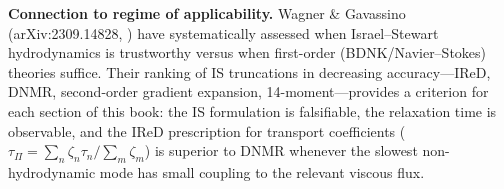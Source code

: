 \medskip\noindent\textbf{Connection to regime of applicability.}
Wagner \& Gavassino (arXiv:2309.14828, \citealt{WagnerGavassinoRegime2024})
have systematically assessed when Israel--Stewart hydrodynamics is
trustworthy versus when first-order (BDNK/Navier--Stokes) theories
suffice.  Their ranking of IS truncations in decreasing accuracy---IReD,
DNMR, second-order gradient expansion, 14-moment---provides a criterion
for each section of this book: the IS formulation is falsifiable, the
relaxation time is observable, and the IReD prescription for transport
coefficients ($\tau_\Pi = \sum_n \zeta_n \tau_n / \sum_m \zeta_m$) is
superior to DNMR whenever the slowest non-hydrodynamic mode has small
coupling to the relevant viscous flux.
